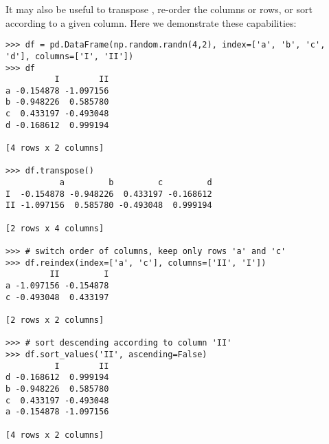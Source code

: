 It may also be useful to transpose , re-order the columns or rows, or sort according to a
given column.
Here we demonstrate these capabilities:
\begin{lstlisting}
>>> df = pd.DataFrame(np.random.randn(4,2), index=['a', 'b', 'c', 'd'], columns=['I', 'II'])
>>> df
          I        II
a -0.154878 -1.097156
b -0.948226  0.585780
c  0.433197 -0.493048
d -0.168612  0.999194

[4 rows x 2 columns]

>>> df.transpose()
           a         b         c         d
I  -0.154878 -0.948226  0.433197 -0.168612
II -1.097156  0.585780 -0.493048  0.999194

[2 rows x 4 columns]

>>> # switch order of columns, keep only rows 'a' and 'c'
>>> df.reindex(index=['a', 'c'], columns=['II', 'I'])
         II         I
a -1.097156 -0.154878
c -0.493048  0.433197

[2 rows x 2 columns]

>>> # sort descending according to column 'II'
>>> df.sort_values('II', ascending=False)
          I        II
d -0.168612  0.999194
b -0.948226  0.585780
c  0.433197 -0.493048
a -0.154878 -1.097156

[4 rows x 2 columns]
\end{lstlisting}

\begin{comment}
\subsection*{Basic Statistical Functions}

The pandas library allows us to easily calculate basic summary statistics of our data,
useful when we want a quick description of the data.
The \li{describe()} function
outputs several such summary statistics for each column in a \li{DataFrame}:
\begin{lstlisting}
>>> df.describe()
              I        II
count  4.000000  4.000000
mean  -0.209630 -0.001308
std    0.566696  0.964083
min   -0.948226 -1.097156
25%   -0.363516 -0.644075
50%   -0.161745  0.046366
75%   -0.007859  0.689133
max    0.433197  0.999194

[8 rows x 2 columns]
\end{lstlisting}

Functions for calculating means and variances, the covariance and correlation matrices, and other
basic statistics are also available.
Below, we calculate the means of each row, as well as the
covariance matrix:
\begin{lstlisting}
>>> df.mean(axis=1)
a   -0.626017
b   -0.181223
c   -0.029925
d    0.415291
dtype: float64

>>> df.cov()
           I        II
I   0.321144 -0.256229
II -0.256229  0.929456

[2 rows x 2 columns]
\end{lstlisting}
\end{comment}

